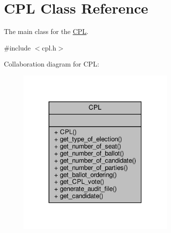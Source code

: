 \hypertarget{classCPL}{}\section{C\+PL Class Reference}
\label{classCPL}


The main class for the \hyperlink{classCPL}{C\+PL}.  




{\ttfamily \#include $<$cpl.\+h$>$}



Collaboration diagram for C\+PL\+:\nopagebreak
\begin{figure}[H]
\begin{center}
\leavevmode
\includegraphics[width=223pt]{classCPL__coll__graph}
\end{center}
\end{figure}
